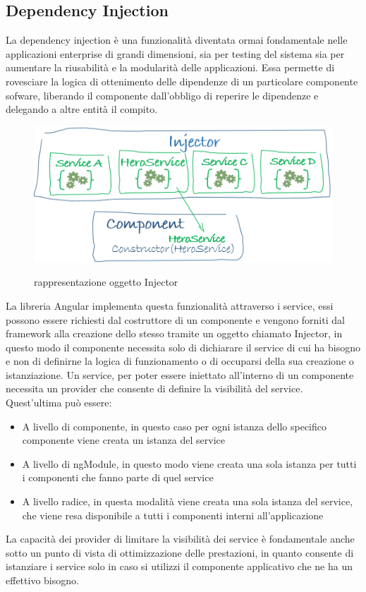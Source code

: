 \subsection{Dependency Injection}
La dependency injection è una funzionalità diventata ormai fondamentale nelle applicazioni enterprise di grandi dimensioni, sia per testing del sistema sia per aumentare la riusabilità e la modularità delle applicazioni. Essa permette di rovesciare la logica di ottenimento delle dipendenze di un particolare componente sofware, liberando il componente dall'obbligo di reperire le dipendenze e delegando a altre entità il compito.
\begin{figure}[H]
    \centering
 \includegraphics[scale=0.75]{resources/injector-injects.png}
\cite{angular-doc}
   \caption{rappresentazione oggetto Injector}
\end{figure}
La libreria Angular implementa questa funzionalità attraverso i service, essi possono essere richiesti dal costruttore di un componente e vengono forniti dal framework alla creazione dello stesso tramite un oggetto chiamato Injector, in questo modo il componente necessita solo di dichiarare il service di cui ha bisogno e non di definirne la logica di funzionamento o di occuparsi della sua creazione o istanziazione.
\newline
\newline
Un service, per poter essere iniettato all'interno di un componente necessita un provider che consente di definire la visibilità del service.
Quest'ultima può essere:
\begin{itemize}
    \item A livello di componente, in questo caso per ogni istanza dello specifico componente viene creata un istanza del service
    \item A livello di ngModule, in questo modo viene creata una sola istanza per tutti i componenti che fanno parte di quel service
    \item A livello radice, in questa modalità viene creata una sola istanza del service, che viene resa disponibile a tutti i componenti interni all'applicazione
\end{itemize}
La capacità dei provider di limitare la visibilità dei service è fondamentale anche sotto un punto di vista di ottimizzazione delle prestazioni, in quanto consente di istanziare i service solo in caso si utilizzi il componente applicativo che ne ha un effettivo bisogno.
\newpage
